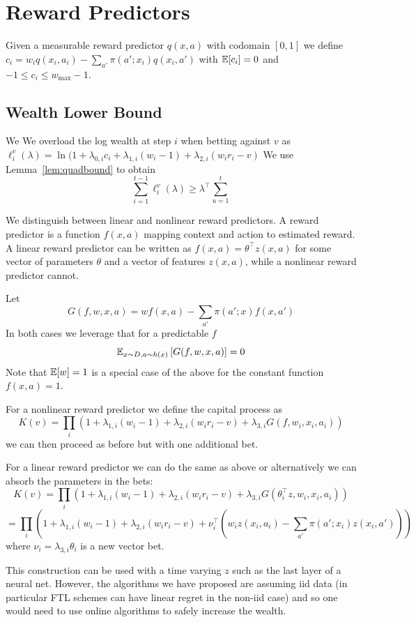 \section{Reward Predictors}
\label{app:reward-predictors}
Given a measurable reward predictor $q(x,a)$ 
with codomain $[0,1]$ we define
$
c_i = w_i q(x_i,a_i) - \sum_{a'} \pi(a';x_i)q(x_i,a')
$ 
with $\mathbb{E}[c_i]=0$ and $-1\leq c_i \leq w_{\max}-1$.

\subsection{Wealth Lower Bound}
We 
We overload the log wealth at step $i$ when betting against $v$ as 
$\ell_i^v(\lambda) = \ln(1+\lambda_{0,i} c_i + \lambda_{1,i}(w_i-1) + \lambda_{2,i}(w_i r_i -v)$
We use Lemma~\ref{lem:quadbound} to obtain
\[
\sum_{i=1}^{t-1} \ell_i^v(\lambda) \geq \lambda^\top \sum_{u=1}^{t} 
\]

We distinguish between linear and nonlinear reward predictors.
A reward predictor is a function $f(x,a)$ mapping
context and action to estimated reward. A linear 
reward predictor can be written
as $f(x,a)=\theta^\top z(x,a)$ for some vector of parameters
$\theta$ and a vector of features $z(x,a)$, while a 
nonlinear reward predictor cannot. 

Let
\[
G(f,w,x,a)= w f(x,a) - \sum_{a'} \pi(a';x) f(x,a')
\]
In both cases we leverage that for a predictable $f$
\[
\mathbb{E}_{x\sim D,a\sim h(x)}\left[G(f,w,x,a)\right] = 0
\]
Note that $\mathbb{E}[w]=1$ is a special case of the above 
for the constant function $f(x,a)=1$. 

For a nonlinear reward predictor we define the capital 
process as
\[
K(v)=\prod_{i} \left(1+\lambda_{1,i} (w_i -1) 
+ \lambda_{2,i} (w_i r_i -v) 
+ \lambda_{3,i} G(f,w_i,x_i,a_i)\right)
\]
we can then proceed as before but with one additional
bet.

For a linear reward predictor we can do the same
as above or alternatively we can absorb the 
parameters in the bets:
\[
K(v)=\prod_{i} \left(1+\lambda_{1,i} (w_i -1) 
+ \lambda_{2,i} (w_i r_i -v) 
+ \lambda_{3,i} G(\theta_i^\top z, w_i,x_i,a_i)\right)
\]
\[
=\prod_{i} \left(1+\lambda_{1,i} (w_i -1) 
+ \lambda_{2,i} (w_i r_i -v) 
+ \nu_i^\top \left(w_i z(x_i,a_i) - \sum_{a'} \pi(a';x_i) z(x_i,a') \right)\right)
\]
where $\nu_i = \lambda_{3,i}\theta_i$ is a new vector bet.

This construction can be used with a time varying $z$
such as the last layer of a neural net. However, the algorithms
we have proposed are assuming iid data (in particular FTL schemes
can have linear regret in the non-iid case) and so one would need to use online algorithms to safely increase the wealth.
